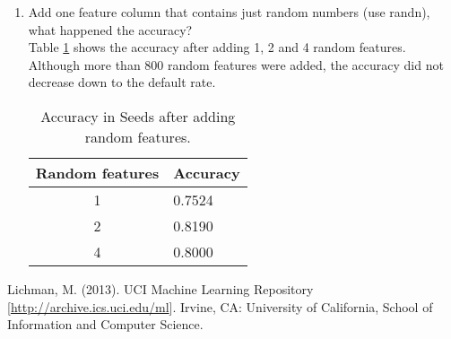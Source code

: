 \documentclass[10pt]{scrartcl}
\begin{document}
\begin{enumerate}
 \item Add one feature column that contains just random numbers (use randn), what happened the accuracy? \\
 Table \ref{tab:acc4} shows the accuracy after adding 1, 2 and 4 random features.  Although more than 800 random features were added, the accuracy did not decrease down to the default rate.
 \begin{table}[h!]
 \centering
 \begin{tabular}{cl}
  \toprule
  \textbf{Random features} & \textbf{Accuracy} \\
  \midrule
  1 & 0.7524 \\ 
  2 & 0.8190 \\
  4 & 0.8000 \\
  \bottomrule
 \end{tabular}
 \caption{Accuracy in Seeds after adding random features.}\label{tab:acc4}
 \end{table}
\end{enumerate}

\begin{thebibliography}{9}

Lichman, M. (2013). UCI Machine Learning Repository [\url{http://archive.ics.uci.edu/ml}]. Irvine, CA: University of California, School of Information and Computer Science.

\end{thebibliography}
\end{document}
